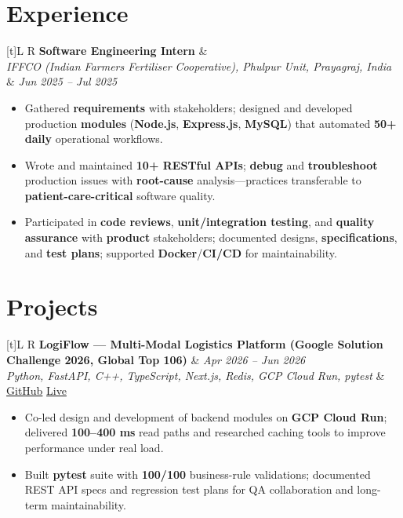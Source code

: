 \documentclass[a4paper,10pt]{article}
\newcommand{\resumeSubheading}[4]{%
  \vspace{0.5mm}
  \noindent
  \begin{tabularx}{\textwidth}[t]{L R}
    \textbf{#1} & #4 \\
    \textit{#3} & \textit{#2} \\
  \end{tabularx}
  \vspace{-0.5mm}%
}
\newcommand{\resumeProject}[4]{%
  \vspace{0.5mm}
  \noindent
  \begin{tabularx}{\textwidth}[t]{L R}
    \textbf{#1} & \textit{#3} \\
    \textit{#2} & #4 \\
  \end{tabularx}
  \vspace{-0.5mm}%
}
\begin{document}
\section{Experience}
\small
\resumeSubheading
  {Software Engineering Intern}{Jun 2025 -- Jul 2025}
  {IFFCO (Indian Farmers Fertiliser Cooperative), Phulpur Unit, Prayagraj, India}{}
\begin{itemize}
  \item Gathered \textbf{requirements} with stakeholders; designed and developed production \textbf{modules} (\textbf{Node.js}, \textbf{Express.js}, \textbf{MySQL}) that automated \textbf{50+ daily} operational workflows.
  \item Wrote and maintained \textbf{10+ RESTful APIs}; \textbf{debug} and \textbf{troubleshoot} production issues with \textbf{root-cause} analysis---practices transferable to \textbf{patient-care-critical} software quality.
  \item Participated in \textbf{code reviews}, \textbf{unit/integration testing}, and \textbf{quality assurance} with \textbf{product} stakeholders; documented designs, \textbf{specifications}, and \textbf{test plans}; supported \textbf{Docker}/\textbf{CI/CD} for maintainability.
\end{itemize}

\section{Projects}
\small

\resumeProject
  {LogiFlow --- Multi-Modal Logistics Platform (Google Solution Challenge 2026, Global Top 106)}
  {Python, FastAPI, C++, TypeScript, Next.js, Redis, GCP Cloud Run, pytest}
  {Apr 2026 -- Jun 2026}
  {\href{https://github.com/Ojas-Srivastava05/LogiFlow-Solution-Challenge-2026}{GitHub} \textbar{} \href{https://logi-flow-solution-challenge-2026.vercel.app/}{Live}}
\begin{itemize}
  \item Co-led design and development of backend modules on \textbf{GCP Cloud Run}; delivered \textbf{100--400 ms} read paths and researched caching tools to improve performance under real load.
  \item Built \textbf{pytest} suite with \textbf{100/100} business-rule validations; documented REST API specs and regression test plans for QA collaboration and long-term maintainability.
\end{itemize}
\end{document}

